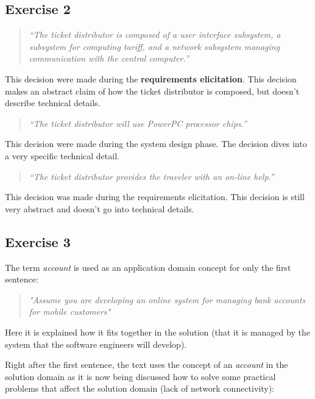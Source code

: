 \documentclass[12pt,letterpaper]{article}
\begin{document}
\subsection{Exercise 2}

\begin{quote}
  \textit{“The ticket distributor is composed of a user interface subsystem, a subsystem for computing tariff, and a network subsystem managing communication with the central computer.”}
\end{quote}

This decision were made during the \textbf{requirements elicitation}. This decision makes
an abstract claim of how the ticket distributor is composed, but doesn't describe technical details.

\begin{quote}
  \textit{“The ticket distributor will use PowerPC processor chips.”}
\end{quote}

This decision were made during the system design phase. The decision dives into a very
specific technical detail. 

\begin{quote}
  \textit{“The ticket distributor provides the traveler with an on-line help.”}
\end{quote}

This decision was made during the requirements elicitation. This decision is still very abstract
and doesn't go into technical details.

\subsection{Exercise 3}

The term \textit{account} is used as an application domain concept for only the first sentence:

\begin{quote}
  \textit{"Assume you are developing an online system for managing bank accounts for mobile customers"}
\end{quote}

Here it is explained how it fits together in the solution (that it is managed by the system that the
software engineers will develop).


Right after the first sentence, the text uses the concept of an \textit{account} in the solution domain
as it is now being discussed how to solve some practical problems that affect the solution domain (lack of network connectivity):
\end{document}
